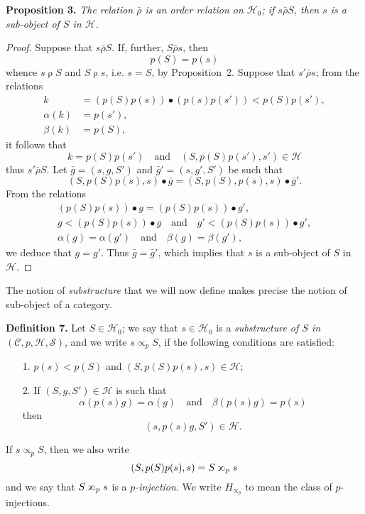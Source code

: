 \documentclass[fleqn]{article}
\newenvironment{itenv}[1]
  {\phantomsection\par\medskip\noindent\textbf{#1.}\itshape}
  {\par\medskip}
\newenvironment{rmenv}[1]
  {\phantomsection\par\medskip\noindent\textbf{#1.}\rmfamily}
  {\par\medskip}
\newcommand{\oldpage}[1]{\marginpar{\footnotesize$\Big\vert$ \textit{p.~#1}}}
\newcommand{\CC}{\mathcal{C}}
\newcommand{\HH}{\mathcal{H}}
\renewcommand{\SS}{\mathcal{S}}
\newcommand{\relrho}{\mathrel{\rho}}
\newcommand{\relrhobar}{\mathrel{\bar{\rho}}}
\newcommand{\subs}{\mathrel{\propto}}
\newcommand{\sups}{\mathrel{\reflectbox{$\propto$}}}
\begin{document}
\begin{itenv}{Proposition 3}
  The relation $\relrhobar$ is an order relation on $\HH_0$;
  if $s\relrhobar S$, then $s$ is a sub-object \cite{5} of $S$ in $\HH$.
\end{itenv}

\begin{proof}
  Suppose that $s\relrhobar S$.
  If, further, $S\relrhobar s$, then
  \[
    p(S)=p(s)
  \]
  whence $s\relrho S$ and $S\relrho s$, i.e. $s=S$, by Proposition~2.
  Suppose that $s'\relrhobar s$;
  from the relations
  \[
    \begin{aligned}
      k
      &= (p(S)p(s))\bullet(p(s)p(s'))
      < p(S)p(s'),
    \\\alpha(k)&=p(s'),
    \\\beta(k)&=p(S),
    \end{aligned}
  \]
  it follows that
  \[
    k=p(S)p(s')
    \quad\text{and}\quad
    (S,p(S)p(s'),s')\in\HH
  \]
  thus $s'\relrhobar S$.
  \oldpage{360}
  Let $\bar{g}=(s,g,S')$ and $\bar{g}'=(s,g',S')$ be such that
  \[
    (S,p(S)p(s),s)\bullet\bar{g}
    = (S,p(S),p(s),s)\bullet\bar{g}'.
  \]
  From the relations
  \[
    \begin{gathered}
      (p(S)p(s))\bullet g = (p(S)p(s))\bullet g',
    \\g < (p(S)p(s))\bullet g
      \quad\text{and}\quad
      g' < (p(S)p(s))\bullet g',
    \\\alpha(g)=\alpha(g')
      \quad\text{and}\quad
      \beta(g)=\beta(g'),
    \end{gathered}
  \]
  we deduce that $g=g'$.
  Thus $\bar{g}=\bar{g}'$, which implies that $s$ is a sub-object of $S$ in $\HH$.
\end{proof}

The notion of \emph{substructure} that we will now define makes precise the notion of sub-object of a category.

\begin{rmenv}{Definition 7}
  Let $S\in\HH_0$;
  we say that $s\in\HH_0$ is a \emph{substructure of $S$ in $(\CC,p,\HH,\SS)$}, and we write $s\subs_p S$, if the following conditions are satisfied:
  \begin{enumerate}
    \item[1.]
      $p(s)<p(S)$ and $(S,p(S)p(s),s)\in\HH$;
    \item[2.]
      If $(S,g,S')\in\HH$ is such that
      \[
        \alpha(p(s)g)=\alpha(g)
        \quad\text{and}\quad
        \beta(p(s)g)=p(s)
      \]
      then
      \[
        (s,p(s)g,S')\in\HH.
      \]
  \end{enumerate}
  If $s\subs_pS$, then we also write
  \[
    (S,p(S)p(s),s)
    = S\sups_p s
  \]
  and we say that $S\sups_p s$ is a \emph{$p$-injection}.
  We write $H_{\subs_p}$ to mean the class of $p$-injections.
\end{rmenv}
\end{document}
